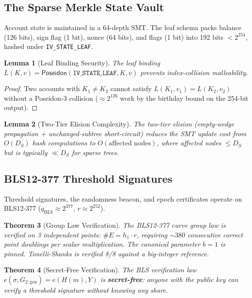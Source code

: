 \documentclass[11pt, a4paper]{article}
\theoremstyle{plain}
\newtheorem{theorem}{Theorem}
\newtheorem{lemma}[theorem]{Lemma}
\theoremstyle{definition}
\theoremstyle{remark}
\begin{document}
\subsection{The Sparse Merkle State Vault}

Account state is maintained in a 64-depth SMT. The leaf schema packs
balance (126 bits), sign flag (1 bit), nonce (64 bits), and flags
(1 bit) into 192 bits $< 2^{254}$, hashed under \texttt{IV\_STATE\_LEAF}.

\begin{lemma}[Leaf Binding Security]
The leaf binding $L(K, v) = \textsf{Poseidon}(\texttt{IV\_STATE\_LEAF}, K, v)$ prevents index-collision malleability.
\end{lemma}
\begin{proof}
Two accounts with $K_1 \neq K_2$ cannot satisfy
 $L(K_1, v_1) = L(K_2, v_2)$ without a Poseidon-3 collision
($\approx 2^{126}$ work by the birthday bound on the 254-bit output).
\end{proof}

\begin{lemma}[Two-Tier Elision Complexity]
The two-tier elision (empty-wedge propagation + unchanged-subtree
short-circuit) reduces the SMT update cost from $O(D_S)$ hash
computations to $O(\text{affected nodes})$, where affected nodes
 $\le D_S$ but is typically $\ll D_S$ for sparse trees.
\end{lemma}

\subsection{BLS12-377 Threshold Signatures}

Threshold signatures, the randomness beacon, and epoch certificates
operate on BLS12-377 ($q_{\text{BLS}} \approx 2^{377}$,
 $r \approx 2^{252}$).

\begin{theorem}[Group Law Verification]
The BLS12-377 curve group law is verified on 3 independent points:
 $\#E = h_1 \cdot r$, requiring $\sim 380$ consecutive correct point
doublings per scalar multiplication. The canonical parameter $b = 1$ is pinned. Tonelli-Shanks is verified 8/8 against a big-integer
reference.
\end{theorem}

\begin{theorem}[Secret-Free Verification]
The BLS verification law $e(\sigma, G_{2,\mathrm{gen}}) = e(H(m), Y)$ is \textbf{secret-free}: anyone with the public key can verify a
threshold signature without knowing any share.
\end{theorem}
\end{document}
